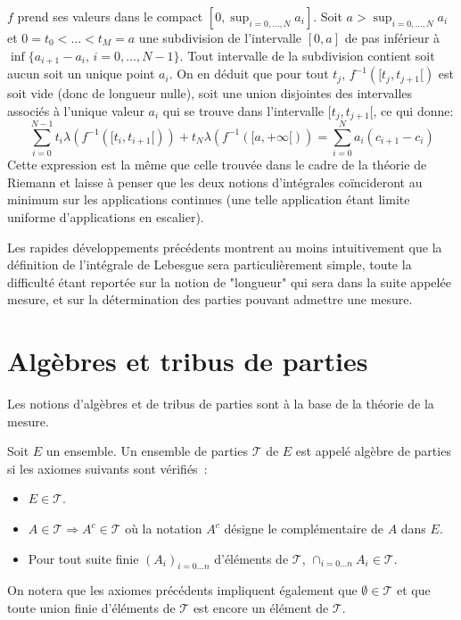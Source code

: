 $f$ prend ses valeurs dans le compact $[0,
\sup_{i=0,\dots ,N}a_i]$. Soit $a > \sup_{i=0,\dots ,N}a_i$ et $0 = t_0 < \dots
< t_M = a$ une subdivision de l'intervalle $[0,a]$ de pas inférieur à $\inf
\{a_{i+1}-a_i, \, i=0, \dots, N-1\}$. Tout intervalle de la subdivision contient
soit aucun soit un unique point $a_i$. On en déduit que pour tout $t_j$,
$f^{-1}([t_j, t_{j+1}[)$ est soit vide (donc de longueur nulle), soit une union
disjointes des intervalles associés à l'unique valeur $a_i$ qui se trouve dans l'intervalle $[t_j, t_{j+1}[$, ce qui donne: 
\[
\sum_{i=0}^{N-1} t_{i} \lambda(f^{-1}([t_i, t_{i+1}[)) + t_N
\lambda(f^{-1}([a, +\infty[)) = \sum_{i=0}^N a_i (c_{i+1} - c_i)
\]
Cette expression est la même que celle trouvée dans le cadre de la théorie de
Riemann et laisse à penser que les deux notions d'intégrales coïncideront au
minimum sur les applications continues (une telle application étant limite
uniforme d'applications en escalier).

Les rapides développements précédents montrent au moins intuitivement que la
définition de l'intégrale de Lebesgue sera particulièrement simple, toute la
difficulté étant reportée sur la notion de "longueur" qui sera dans la suite
appelée mesure, et sur la détermination des parties pouvant admettre une mesure.
\section{Algèbres et tribus de parties}
Les notions d'algèbres et de tribus de parties sont à la base de
la théorie de la mesure.
\begin{mandatory}
\begin{defn}
Soit $E$ un ensemble. Un ensemble de parties $\mathcal{T}$ de $E$ est
appelé algèbre de parties si les axiomes suivants sont vérifiés~:
\begin{itemize}
\item $E \in \mathcal{T}$.
\item $A \in \mathcal{T} \Rightarrow A^c \in \mathcal{T}$ où la
  notation $A^c$ désigne le complémentaire de $A$ dans $E$.
\item Pour tout suite finie $(A_i)_{i=0\dots n}$ d'éléments de
  $\mathcal{T}$, $\cap_{i=0\dots n }  A_i \in \mathcal{T}$.
\end{itemize}
\end{defn}
\end{mandatory}
On notera que les axiomes précédents impliquent également que
$\emptyset \in \mathcal{T}$ et que toute union finie d'éléments de
$\mathcal{T}$ est encore un élément de $\mathcal{T}$.

